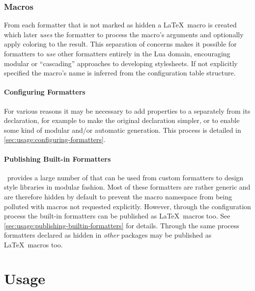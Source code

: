 \documentclass[12pt]{scrartcl}
\begin{document}
\subsubsection{Macros}
\label{sec:intro:walkthrough:macros}

From each formatter that is not marked as hidden a
\LaTeX\ macro is created which later \emph{uses} the formatter to process the
macro's arguments and optionally apply coloring to the result. This separation
of concerns makes it possible for formatters to \emph{use} other formatters
entirely in the Lua domain, encouraging modular or “cascading” approaches to
developing stylesheets. If not explicitly specified the macro's name is inferred
from the configuration table structure.


\paragraph{Configuring Formatters}
\label{sec:intro:walkthrough:configuring-formatters}

For various reasons it may be necessary to add properties to a  separately from its declaration, for example to make the original declaration simpler, or to enable some kind of modular and/or automatic generation.  This process is detailed in \vref{sec:usage:configuring-formatters}.


\paragraph{Publishing Built-in Formatters}
\label{sec:intro:walkthrough:publishing-builtin-formatters}

\luaformatters\ provides a large number of  that can be used from custom formatters to design style libraries in
modular fashion.  Most of these formatters are rather generic and are therefore
hidden by default to prevent the macro namespace from being polluted with macros
not requested explicitly.  However, through the configuration process the
built-in formatters can be published as \LaTeX\ macros too.  See
\vref{sec:usage:publishing-builtin-formatters} for details.  Through the same
process formatters declared as hidden in \emph{other} packages may be published
as \LaTeX\ macros too.




\section{Usage}
\label{sec:usage}
\end{document}
